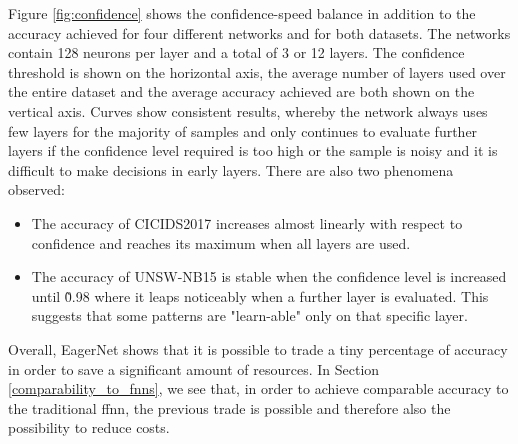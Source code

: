 \documentclass[conference]{IEEEtran}
\begin{document}
Figure \ref{fig:confidence} shows the confidence-speed balance in addition to the accuracy achieved for four different networks and for both datasets. The networks contain 128 neurons per layer and a total of 3 or 12 layers. The confidence threshold is shown on the horizontal axis, the average number of layers used over the entire dataset and the average accuracy achieved are both shown on the vertical axis. Curves show consistent results, whereby the network always uses few layers for the majority of samples and only continues to evaluate further layers if the confidence level required is too high or the sample is noisy and it is difficult to make decisions in early layers. There are also two phenomena observed:
\begin{itemize}
\item The accuracy of CICIDS2017 increases almost linearly with respect to confidence and reaches its maximum when all layers are used.
\item The accuracy of UNSW-NB15 is stable when the confidence level is increased until \~0.98 where it leaps noticeably when a further layer is evaluated. This suggests that some patterns are "learn-able" only on that specific layer.
\end{itemize}
Overall, EagerNet shows that it is possible to trade a tiny percentage of accuracy in order to save a significant amount of resources. In Section \ref{comparability_to_fnns}, we see that, in order to achieve comparable accuracy to the traditional \gls{ffnn}, the previous trade is possible and therefore also the possibility to reduce costs.
\end{document}
